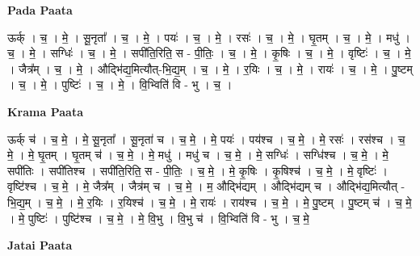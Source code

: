 \documentclass[17pt]{extarticle}
\begin{document}
\textbf{Pada Paata} \newline

ऊर्क् । च॒ । मे॒ । सू॒नृता᳚ । च॒ । मे॒ । पयः॑ । च॒ । मे॒ । रसः॑ । च॒ । मे॒ । घृ॒तम् । च॒ । मे॒ । मधु॑ । च॒ । मे॒ । सग्धिः॑ । च॒ । मे॒ । सपी॑ति॒रिति॒ स - पी॒तिः॒ । च॒ । मे॒ । कृ॒षिः । च॒ । मे॒ । वृष्टिः॑ । च॒ । मे॒ । जैत्र᳚म् । च॒ । मे॒ । औद्भि॑द्य॒मित्यौत्-भि॒द्य॒म् । च॒ । मे॒ । र॒यिः । च॒ । मे॒ । रायः॑ । च॒ । मे॒ । पु॒ष्टम् । च॒ । मे॒ । पुष्टिः॑ । च॒ । मे॒ । वि॒भ्विति॑ वि - भु । च॒ ।  \newline


\textbf{Krama Paata} \newline

ऊर्क् च॑ । च॒ मे॒ । मे॒ सू॒नृता᳚ । सू॒नृता॑ च । च॒ मे॒ । मे॒ पयः॑ । पय॑श्च । च॒ मे॒ । मे॒ रसः॑ । रस॑श्च । च॒ मे॒ । मे॒ घृ॒तम् । घृ॒तम् च॑ । च॒ मे॒ । मे॒ मधु॑ । मधु॑ च । च॒ मे॒ । मे॒ सग्धिः॑ । सग्धि॑श्च । च॒ मे॒ । मे॒ सपी॑तिः । सपी॑तिश्च । सपी॑ति॒रिति॒ स - पी॒तिः॒ । च॒ मे॒ । मे॒ कृ॒षिः । कृ॒षिश्च॑ । च॒ मे॒ । मे॒ वृष्टिः॑ । वृष्टि॑श्च । च॒ मे॒ । मे॒ जैत्र᳚म् । जैत्र॑म् च । च॒ मे॒ । म॒ औद्भि॑द्यम् । औद्भि॑द्यम् च । औद्भि॑द्य॒मित्यौत् - भि॒द्य॒म् । च॒ मे॒ । मे॒ र॒यिः । र॒यिश्च॑ । च॒ मे॒ । मे॒ रायः॑ । राय॑श्च । च॒ मे॒ । मे॒ पु॒ष्टम् । पु॒ष्टम् च॑ । च॒ मे॒ । मे॒ पुष्टिः॑ । पुष्टि॑श्च । च॒ मे॒ । मे॒ वि॒भु । वि॒भु च॑ । वि॒भ्विति॑ वि - भु । च॒ मे॒ \newline

\textbf{Jatai Paata} \newline
\end{document}
